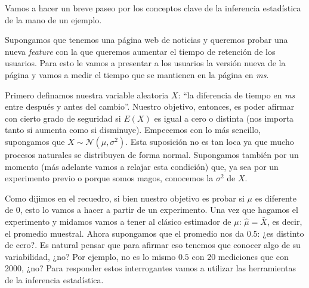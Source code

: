\documentclass[
  letterpaper,
  DIV=11,
  numbers=noendperiod,
  oneside]{scrreprt}
\begin{document}
Vamos a hacer un breve paseo por los conceptos clave de la inferencia
estadística de la mano de un ejemplo.

\begin{tcolorbox}[enhanced jigsaw, breakable, rightrule=.15mm, colbacktitle=quarto-callout-tip-color!10!white, bottomtitle=1mm, arc=.35mm, titlerule=0mm, left=2mm, toprule=.15mm, leftrule=.75mm, colback=white, opacitybacktitle=0.6, opacityback=0, colframe=quarto-callout-tip-color-frame, bottomrule=.15mm, coltitle=black, toptitle=1mm, title=\textcolor{quarto-callout-tip-color}{\faLightbulb}\hspace{0.5em}{El ejemplo de inferencia}]
Supongamos que tenemos una página web de noticias y queremos probar una
nueva \emph{feature} con la que queremos aumentar el tiempo de retención
de los usuarios. Para esto le vamos a presentar a los usuarios la
versión nueva de la página y vamos a medir el tiempo que se mantienen en
la página en \emph{ms}.
\end{tcolorbox}

Primero definamos nuestra variable aleatoria \(X\): ``la diferencia de
tiempo en \emph{ms} entre después y antes del cambio''. Nuestro
objetivo, entonces, es poder afirmar con cierto grado de seguridad si
\(E(X)\) es igual a cero o distinta (nos importa tanto si aumenta como
si disminuye). Empecemos con lo más sencillo, supongamos que
\(X \sim \mathcal{N}(\mu, \sigma^2)\). Esta suposición no es tan loca ya
que mucho procesos naturales se distribuyen de forma normal. Supongamos también
por un momento (más adelante vamos a relajar esta condición) que, ya sea
por un experimento previo o porque somos magos, conocemos la
\(\sigma^2\) de \(X\).

Como dijimos en el recuedro, si bien nuestro objetivo es probar si
\(\mu\) es diferente de \(0\), esto lo vamos a hacer a partir de un
experimento. Una vez que hagamos el experimento y midamos vamos a tener
al clásico estimador de \(\mu\): \(\hat{\mu}=\bar{X}\), es decir, el
promedio muestral. Ahora supongamos que el promedio nos da \(0.5\): ¿es
distinto de cero?. Es natural pensar que para afirmar eso tenemos que
conocer algo de su variabilidad, ¿no? Por ejemplo, no es lo mismo
\(0.5\) con 20 mediciones que con 2000, ¿no? Para responder estos
interrogantes vamos a utilizar las herramientas de la inferencia
estadística.
\end{document}
